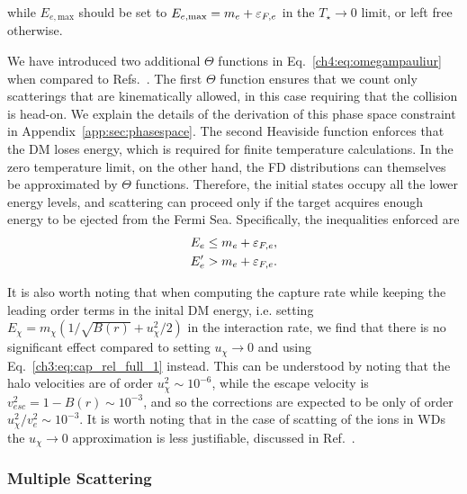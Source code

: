 while $E_{e,\mathrm{max}}$ should be set to $E_{e,\mathrm{max}}=m_e+\varepsilon_{F,e}$ in the $T_\star\rightarrow0$ limit, or left free otherwise. 


We have introduced two additional $\Theta$ functions in Eq.~\ref{ch4:eq:omegampauliur} when compared to Refs.~\cite{Bell:2020jou_sep_ImprovedTreatmentDark,Bell:2020lmm_mar_ImprovedTreatmentDark}. 
The first $\Theta$ function ensures that we count only scatterings that are kinematically allowed, in this case requiring that the collision is head-on. 
We explain the details of the derivation of this phase space constraint in Appendix~\ref{app:sec:phasespace}. 
The second Heaviside function enforces that the DM loses energy, which is required for finite temperature calculations. 
In the zero temperature limit, on the other hand, the FD distributions can themselves be approximated by $\Theta$ functions. Therefore, the initial states occupy all the lower energy levels, and scattering can proceed only if the target acquires enough energy to be ejected from the Fermi Sea. 
Specifically, the  inequalities enforced are
\begin{align}
E_e &\le m_e +\varepsilon_{F,e},\\
E_e' &> m_e +\varepsilon_{F,e}.
\end{align}

It is also worth noting that when computing the capture rate while keeping the leading order terms in the inital DM energy, i.e. setting $E_\chi = m_\chi(1/\sqrt{B(r)} + u_\chi^2/2)$ in the interaction rate, we find that there is no significant effect compared to setting $u_\chi \rightarrow 0$ and using Eq.~\ref{ch3:eq:cap_rel_full_1} instead. This can be understood by noting that the halo velocities are of order $u_\chi^2\sim 10^{-6}$, while the escape velocity is $v_{esc}^2 = 1 - B(r) \sim 10^{-3}$, and so the corrections are expected to be only of order $u_\chi^2/v_e^2  \sim 10^{-3}$.  It is worth noting that in the case of scatting of the ions in WDs the $u_\chi \rightarrow 0$ approximation is less justifiable, discussed in Ref.~\cite{Bell:2021fye_oct_Improvedtreatmentdark}.

\subsubsection{Multiple Scattering}
\label{ch4:subsubsec:mselectrons}


